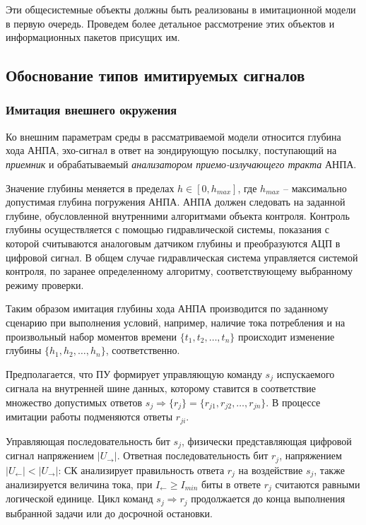 Эти общесистемные объекты должны быть реализованы в имитационной модели в первую очередь.
Проведем более детальное рассмотрение этих объектов и информационных пакетов присущих им.


\subsection{Обоснование типов имитируемых сигналов}

\subsubsection{Имитация внешнего окружения}\label{sec:model_anpa:outer_params}
Ко внешним параметрам среды в рассматриваемой модели относится
глубина хода АНПА, эхо-сигнал в ответ на зондирующую посылку,
поступающий на \textit{приемник} и обрабатываемый \textit{анализатором приемо-излучающего тракта} АНПА.

Значение глубины меняется в пределах $h \in [0, h_{max}]$, где $h_{max}$ -- максимально допустимая глубина погружения АНПА.
АНПА должен следовать на заданной глубине, обусловленной внутренними алгоритмами объекта контроля.
Контроль глубины осуществляется с помощью гидравлической системы,
показания с которой считываются аналоговым датчиком глубины и преобразуются АЦП в цифровой сигнал.
В общем случае гидравлическая система управляется системой контроля,
по заранее определенному алгоритму, соответствующему выбранному режиму проверки.

Таким образом имитация глубины хода АНПА производится по заданному сценарию
при выполнения условий, например, наличие тока потребления
и на произвольный набор моментов времени $\{t_1, t_2, \ldots, t_n\}$
происходит изменение глубины $\{h_1, h_2, \ldots, h_n\}$, соответственно.


Предполагается, что ПУ формирует управляющую команду $s_j$ испускаемого сигнала на внутренней шине данных,
которому ставится в соответствие множество допустимых ответов $s_j \Rightarrow \{r_j\} = \{r_{j1}, r_{j2}, \ldots, r_{jn}\}$.
В процессе имитации работы подменяются ответы $r_{ji}$.

Управляющая последовательность бит $s_j$, физически представляющая цифровой сигнал напряжением $|U_{\longrightarrow}|$.
Ответная последовательность бит $r_j$, напряжением $|U_{\longleftarrow}| < |U_{\longrightarrow}|$:
СК анализирует правильность ответа $r_j$ на воздействие $s_j$,
также анализируется величина тока, при $I_{\longleftarrow} \geq I_{min}$ биты в ответе $r_j$ считаются равными логической единице.
Цикл команд $s_j \Rightarrow r_j$ продолжается до конца выполнения выбранной задачи или до досрочной остановки.

